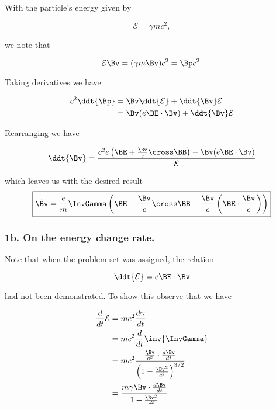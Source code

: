 With the particle's energy given by

\begin{equation}\label{eqn:relElectroDynProblemSet2:150}
\mathcal{E} = \gamma m c^2,
\end{equation}

we note that

\begin{equation}\label{eqn:relElectroDynProblemSet2:170}
\mathcal{E}\Bv = (\gamma m \Bv) c^2 = \Bp c^2.
\end{equation}

Taking derivatives we have

\begin{align*}
c^2 \ddt{\Bp} 
&= \Bv \ddt{\mathcal{E}} + \ddt{\Bv} \mathcal{E} \\
&= \Bv (e \BE \cdot \Bv) + \ddt{\Bv} \mathcal{E} \\
\end{align*}

Rearranging we have

\begin{equation}\label{eqn:relElectroDynProblemSet2:190}
\ddt{\Bv}
=
\frac{c^2 e \left( \BE + \frac{\Bv}{c} \cross \BB \right) - \Bv (e \BE \cdot \Bv) }{ \mathcal{E} } 
\end{equation}

which leaves us with the desired result
\begin{equation}\label{eqn:relElectroDynProblemSet2:210}
\boxed{
\dot{\Bv} =
\frac{e}{m} \InvGamma \left( \BE + \frac{\Bv}{c} \cross \BB - \frac{\Bv}{c} \left(\BE \cdot \frac{\Bv}{c} \right) \right)
}
\end{equation}

\subsubsection{1b.  On the energy change rate.}

Note that when the problem set was assigned, the relation

\begin{equation}\label{eqn:relElectroDynProblemSet2:230}
\ddt{\mathcal{E}} = e \BE \cdot \Bv
\end{equation}

had not been demonstrated.  To show this observe that we have

\begin{align*}
\frac{d}{dt} \mathcal{E}
&= m c^2 \frac{d\gamma}{dt} \\
&= m c^2 \frac{d}{dt} \inv{\InvGamma} \\
&= m c^2 \frac{\frac{\Bv}{c^2} \cdot \frac{d\Bv}{dt}}{\left(1 - \frac{\Bv^2}{c^2}\right)^{3/2}} \\
&= \frac{m \gamma \Bv \cdot \frac{d\Bv}{dt}}{1 - \frac{\Bv^2}{c^2}}
\end{align*}

